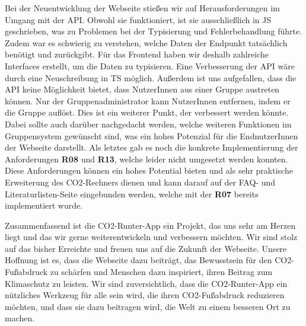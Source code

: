 Bei der Neuentwicklung der Webseite stießen wir auf Herausforderungen im Umgang mit der \acs{API}. Obwohl sie funktioniert, ist sie ausschließlich in \acl{JS} geschrieben, was zu Problemen bei der Typisierung und Fehlerbehandlung führte. Zudem war es schwierig zu verstehen, welche Daten der Endpunkt tatsächlich benötigt und zurückgibt. Für das Frontend haben wir deshalb zahlreiche Interfaces erstellt, um die Daten zu typisieren. Eine Verbesserung der \acs{API} wäre durch eine Neuschreibung in \acl{TS} möglich. Außerdem ist uns aufgefallen, dass die \acs{API} keine Möglichkeit bietet, dass NutzerInnen aus einer Gruppe austreten können. Nur der Gruppenadministrator kann NutzerInnen entfernen, indem er die Gruppe auflöst. Dies ist ein weiterer Punkt, der verbessert werden könnte. Dabei sollte auch darüber nachgedacht werden, welche weiteren Funktionen im Gruppensystem gewünscht sind, was ein hohes Potenzial für die EndnutzerInnen der Webseite darstellt. Als letztes gab es noch die konkrete Implementierung der Anforderungen \textbf{R08} und \textbf{R13}, welche leider nicht umgesetzt werden konnten. Diese Anforderungen können ein hohes Potential bieten und als sehr praktische Erweiterung des CO2-Rechners dienen und kann darauf auf der FAQ- und Literaturlisten-Seite eingebunden werden, welche mit der \textbf{R07} bereits implementiert wurde.


Zusammenfassend ist die CO2-Runter-App ein Projekt, das uns sehr am Herzen liegt und das wir gerne weiterentwickeln und verbessern möchten. Wir sind stolz auf das bisher Erreichte und freuen uns auf die Zukunft der Webseite. Unsere Hoffnung ist es, dass die Webseite dazu beiträgt, das Bewusstsein für den CO2-Fußabdruck zu schärfen und Menschen dazu inspiriert, ihren Beitrag zum Klimaschutz zu leisten. Wir sind zuversichtlich, dass die CO2-Runter-App ein nützliches Werkzeug für alle sein wird, die ihren CO2-Fußabdruck reduzieren möchten, und dass sie dazu beitragen wird, die Welt zu einem besseren Ort zu machen.
